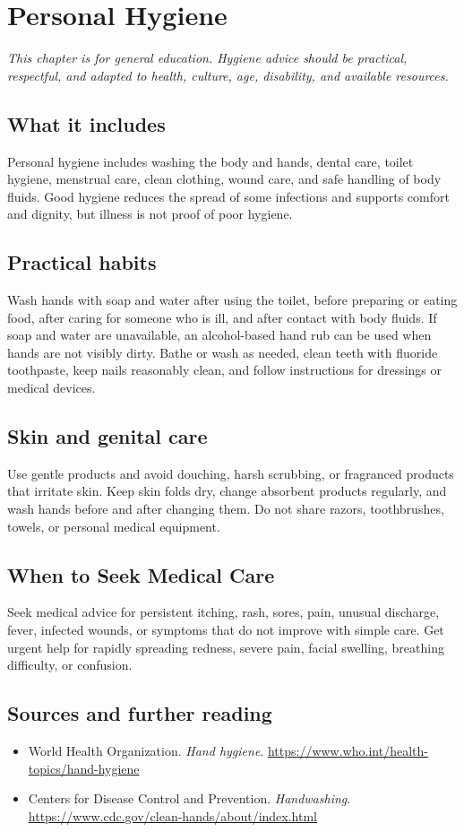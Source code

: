 \chapter{Personal Hygiene}

\medskip
\noindent\textit{This chapter is for general education. Hygiene advice should be practical, respectful, and adapted to health, culture, age, disability, and available resources.}

\section*{What it includes}
Personal hygiene includes washing the body and hands, dental care, toilet hygiene, menstrual care, clean clothing, wound care, and safe handling of body fluids. Good hygiene reduces the spread of some infections and supports comfort and dignity, but illness is not proof of poor hygiene.

\section*{Practical habits}
Wash hands with soap and water after using the toilet, before preparing or eating food, after caring for someone who is ill, and after contact with body fluids. If soap and water are unavailable, an alcohol-based hand rub can be used when hands are not visibly dirty. Bathe or wash as needed, clean teeth with fluoride toothpaste, keep nails reasonably clean, and follow instructions for dressings or medical devices.

\section*{Skin and genital care}
Use gentle products and avoid douching, harsh scrubbing, or fragranced products that irritate skin. Keep skin folds dry, change absorbent products regularly, and wash hands before and after changing them. Do not share razors, toothbrushes, towels, or personal medical equipment.

\section*{When to Seek Medical Care}
Seek medical advice for persistent itching, rash, sores, pain, unusual discharge, fever, infected wounds, or symptoms that do not improve with simple care. Get urgent help for rapidly spreading redness, severe pain, facial swelling, breathing difficulty, or confusion.

\section*{Sources and further reading}
\begin{itemize}
\item World Health Organization. \textit{Hand hygiene}. \url{https://www.who.int/health-topics/hand-hygiene}
\item Centers for Disease Control and Prevention. \textit{Handwashing}. \url{https://www.cdc.gov/clean-hands/about/index.html}
\end{itemize}
